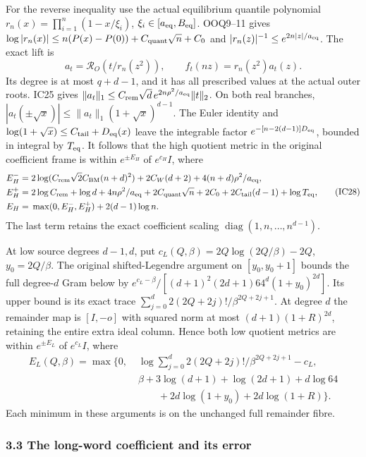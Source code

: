 \documentclass[11pt]{article}
\begin{document}
For the reverse inequality use the actual equilibrium quantile polynomial \(r_n(x)=\prod_{i=1}^n(1-x/\xi_i)\), \(\xi_i\in[a_{\rm eq},B_{\rm eq}]\). OOQ9--11 gives \(\log|r_n(x)|\le n(P(x)-P(0))+C_{\rm quant}\sqrt n+C_0\) and \(|r_n(z)|^{-1}\le e^{2n|z|/a_{\rm eq}}\). The exact lift is \[
a_t=\mathcal R_O(t/r_n(z^2)),\qquad
f_t(nz)=r_n(z^2)a_t(z).
\tag{IC27}
\] Its degree is at most \(q+d-1\), and it has all prescribed values at the actual outer roots. IC25 gives \(\|a_t\|_1\le C_{\rm rem}\sqrt d\,e^{2n\rho^2/a_{\rm eq}}\|t\|_2\). On both real branches, \(|a_t(\pm\sqrt x)|\le\|a_t\|_1(1+\sqrt x)^{d-1}\). The Euler identity and \(\log(1+\sqrt x)\le C_{\rm tail}+D_{\rm eq}(x)\) leave the integrable factor \(e^{-[n-2(d-1)]D_{\rm eq}}\), bounded in integral by \(T_{\rm eq}\). It follows that the high quotient metric in the original coefficient frame is within \(e^{\pm E_H}\) of \(e^{c_H}I\), where \[
\begin{split}
E_H^-={}&2\log(C_{\rm rem}\sqrt2 C_{\rm BM}(n+d)^2)
+2C_W(d+2)+4(n+d)\rho^2/a_{\rm eq},\\
E_H^+={}&2\log C_{\rm rem}+\log d+4n\rho^2/a_{\rm eq}
+2C_{\rm quant}\sqrt n+2C_0+2C_{\rm tail}(d-1)+\log T_{\rm eq},\\
E_H={}&\max(0,E_H^-,E_H^+)+2(d-1)\log n.
\end{split}
\tag{IC28}
\] The last term retains the exact coefficient scaling \(\operatorname{diag}(1,n,\ldots,n^{d-1})\).

At low source degrees \(d-1,d\), put \(c_L(Q,\beta)=2Q\log(2Q/\beta)-2Q\), \(y_0=2Q/\beta\). The original shifted-Legendre argument on \([y_0,y_0+1]\) bounds the full degree-\(d\) Gram below by \(e^{c_L-\beta}/[(d+1)^2(2d+1)64^d(1+y_0)^{2d}]\). Its upper bound is its exact trace \(\sum_{j=0}^d2(2Q+2j)!/\beta^{2Q+2j+1}\). At degree \(d\) the remainder map is \([I,-o]\) with squared norm at most \((d+1)(1+R)^{2d}\), retaining the entire extra ideal column. Hence both low quotient metrics are within \(e^{\pm E_L}\) of \(e^{c_L}I\), where \[
\begin{split}
E_L(Q,\beta)=\max\{0,\;&
\log\sum_{j=0}^d2(2Q+2j)!/\beta^{2Q+2j+1}-c_L,\\
&\beta+3\log(d+1)+\log(2d+1)+d\log64\\
&\qquad+2d\log(1+y_0)+2d\log(1+R)\}.
\end{split}
\tag{IC29}
\] Each minimum in these arguments is on the unchanged full remainder fibre.

\subsubsection{3.3 The long-word coefficient and its error}\label{the-long-word-coefficient-and-its-error}
\end{document}
